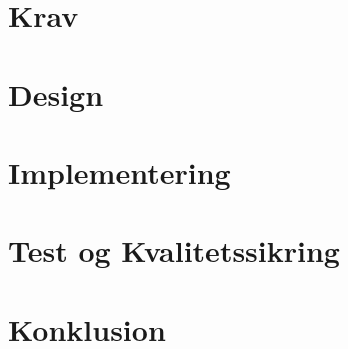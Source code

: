 \documentclass[11pt,a4paper]{article}  	%
\begin{document}
\newpage
\section{Krav}


\newpage
\section{Design}


\newpage
\section{Implementering}


\newpage
\section{Test og Kvalitetssikring}


\section{Konklusion}



\newpage

\end{document}
